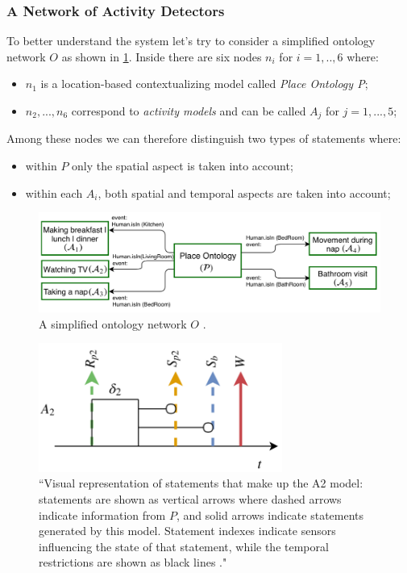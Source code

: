 \documentclass{thesisreport}
\begin{document}
 \subsubsection{A Network of Activity Detectors}
 To better understand the system let's try to consider a simplified ontology network $O$ as shown in \ref{fig:simplifiedOntologyNetwork}.
 Inside there are six nodes $n_i$ for $i=1,..,6$ where:
 \begin{itemize}
    \item $n_1$ is a location-based contextualizing model called \textit{Place Ontology P};
    \item $n_2,...,n_6$ correspond to \textit{activity models} and can be called $A_j$ for $j=1,...,5$;
 \end{itemize}
 
 Among these nodes we can therefore distinguish two types of statements where:
 \begin{itemize}
     \item within $P$ only the spatial aspect is taken into account;
     \item within each $A_i$, both spatial and temporal aspects are taken into account;
 \end{itemize}
 
  \begin{figure}[h]
	\centering
	\includegraphics[width=15cm]{Thesis/data/O.png}
	\caption{A simplified ontology network $O$ \cite{kareem2018arianna}.}
	\label{fig:simplifiedOntologyNetwork}
  \end{figure}
   \begin{figure}[H]
	\centering
	\includegraphics[width=8cm]{Thesis/data/event.png}
	\caption{``Visual representation of statements that make up the A2 model: statements are shown as vertical arrows where dashed arrows indicate information from $P$, and solid arrows indicate statements generated by this model. Statement indexes indicate sensors influencing the state of that statement, while the temporal restrictions are shown as black lines \cite{kareem2018arianna}."}
	\label{fig:A2}
 \end{figure}
\end{document}
